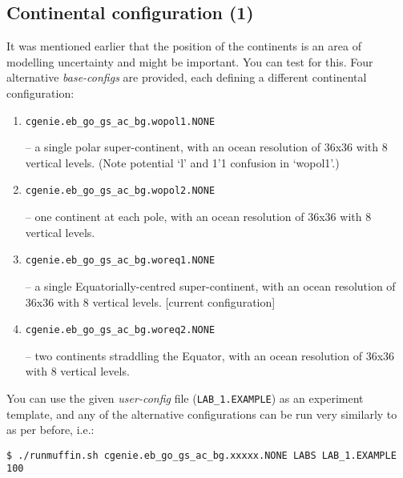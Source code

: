 \documentclass[11pt,fleqn]{book} %
\begin{document}

\subsection{Continental configuration (1)}

It was mentioned earlier that the position of the continents is an area of modelling uncertainty and might be important. You can test for this. Four alternative \textit{base-configs} are provided, each defining a different continental configuration:

\vspace{1mm}
\begin{enumerate}[noitemsep]
\setlength{\itemindent}{.2in}
\item
\begin{verbatim}
cgenie.eb_go_gs_ac_bg.wopol1.NONE
\end{verbatim}
 – a single polar super-continent, with an ocean resolution of 36x36 with 8 vertical levels. (Note potential ‘l’ and 1’1 confusion in ‘wopol1’.)
\item
\begin{verbatim}
cgenie.eb_go_gs_ac_bg.wopol2.NONE
\end{verbatim}
  – one continent at each pole, with an ocean resolution of 36x36 with 8 vertical levels.
\item
\begin{verbatim}
cgenie.eb_go_gs_ac_bg.woreq1.NONE
\end{verbatim}
  – a single Equatorially-centred super-continent, with an ocean resolution of 36x36 with 8 vertical levels. [current configuration]
\item
\begin{verbatim}
cgenie.eb_go_gs_ac_bg.woreq2.NONE
\end{verbatim}
 – two continents straddling the Equator, with an ocean resolution of 36x36 with 8 vertical levels.
\end{enumerate}
\vspace{1mm}

You can use the given \textit{user-config} file (\texttt{LAB\_1.EXAMPLE}) as an experiment template, and any of the alternative configurations can be run very similarly to as per before, i.e.:

\vspace{-2mm}
\begin{verbatim}
$ ./runmuffin.sh cgenie.eb_go_gs_ac_bg.xxxxx.NONE LABS LAB_1.EXAMPLE 100
\end{verbatim}
\vspace{-2mm}
\end{document}
